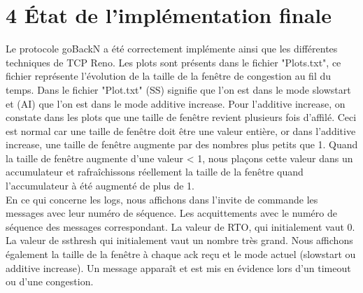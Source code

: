 \documentclass{report}
\begin{document}
\section*{ 4 État de l'implémentation finale }
Le protocole goBackN a été correctement implémente ainsi que les différentes techniques de TCP Reno. Les plots sont présents dans le fichier "Plots.txt", ce fichier représente l'évolution de la taille de la fenêtre de congestion au fil du temps. Dans le fichier "Plot.txt" (SS) signifie que l'on est dans le mode slowstart et (AI) que l'on est dans le mode additive increase. Pour l'additive increase, on constate dans les plots que une taille de fenêtre revient plusieurs fois d'affilé. Ceci est normal car une taille de fenêtre doit être une valeur entière, or dans l'additive increase, une taille de fenêtre augmente par des nombres plus petits que 1. Quand la taille de fenêtre augmente d'une valeur < 1, nous plaçons cette valeur dans un accumulateur et rafraîchissons réellement la taille de la fenêtre quand l'accumulateur à été augmenté de plus de 1.\\

En ce qui concerne les logs, nous affichons dans l'invite de commande les messages avec leur numéro de séquence. Les acquittements avec le numéro de séquence des messages correspondant. La valeur de RTO, qui initialement vaut 0. La valeur de ssthresh qui initialement vaut un nombre très grand. Nous affichons également la taille de la fenêtre à chaque ack reçu et le mode actuel (slowstart ou additive increase). Un message apparaît et est mis en évidence lors d'un timeout ou d'une congestion.
\end{document}
